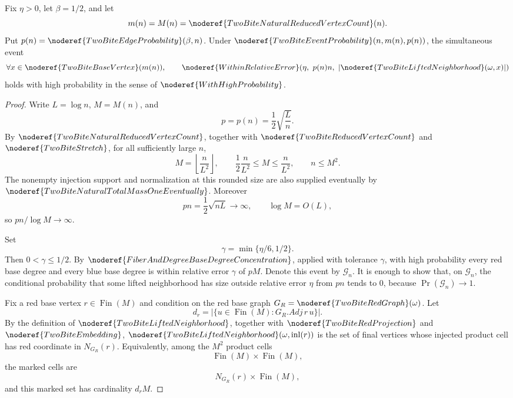 \begin{helper}
Fix \(\eta>0\), let \(\beta=1/2\), and let
\[
m(n)=M(n)=\noderef{TwoBiteNaturalReducedVertexCount}(n).
\]
Put \(p(n)=\noderef{TwoBiteEdgeProbability}(\beta,n)\).  Under
\(\noderef{TwoBiteEventProbability}(n,m(n),p(n))\), the simultaneous event
\[
\forall x\in \noderef{TwoBiteBaseVertex}(m(n)),\qquad
\noderef{WithinRelativeError}\!\left(
  \eta,\ p(n)n,\ |\noderef{TwoBiteLiftedNeighborhood}(\omega,x)|
\right)
\]
holds with high probability in the sense of \(\noderef{WithHighProbability}\).
\end{helper}
\begin{proof}
Write \(L=\log n\), \(M=M(n)\), and
\[
p=p(n)=\frac12\sqrt{\frac{L}{n}}.
\]
By \(\noderef{TwoBiteNaturalReducedVertexCount}\), together with
\(\noderef{TwoBiteReducedVertexCount}\) and \(\noderef{TwoBiteStretch}\), for
all sufficiently large \(n\),
\[
M=\left\lfloor\frac{n}{L^2}\right\rfloor,\qquad
\frac12\frac{n}{L^2}\le M\le \frac n{L^2},\qquad n\le M^2.
\tag{1}
\]
The nonempty injection support and normalization at this rounded size are
also supplied eventually by \(\noderef{TwoBiteNaturalTotalMassOneEventually}\).
Moreover
\[
pn=\frac12\sqrt{nL}\to\infty,\qquad \log M=O(L),
\tag{2}
\]
so \(pn/\log M\to\infty\).

Set
\[
\gamma=\min\{\eta/6,1/2\}.
\]
Then \(0<\gamma\le1/2\).  By
\(\noderef{FiberAndDegreeBaseDegreeConcentration}\), applied with tolerance
\(\gamma\), with high probability every red base degree and every blue base
degree is within relative error \(\gamma\) of \(pM\).  Denote this event by
\(\mathcal G_n\).  It is enough to show that, on \(\mathcal G_n\), the
conditional probability that some lifted neighborhood has size outside
relative error \(\eta\) from \(pn\) tends to \(0\), because
\(\Pr(\mathcal G_n)\to1\).

Fix a red base vertex \(r\in\operatorname{Fin}(M)\) and condition on the red
base graph \(G_R=\noderef{TwoBiteRedGraph}(\omega)\).  Let
\[
d_r=\big|\{u\in\operatorname{Fin}(M):G_R.Adj\,r\,u\}\big|.
\]
By the definition of \(\noderef{TwoBiteLiftedNeighborhood}\), together with
\(\noderef{TwoBiteRedProjection}\) and \(\noderef{TwoBiteEmbedding}\),
\(\noderef{TwoBiteLiftedNeighborhood}(\omega,\operatorname{inl}(r))\) is the
set of final vertices whose injected product cell has red coordinate in
\(N_{G_R}(r)\).  Equivalently, among the \(M^2\) product cells
\[
\operatorname{Fin}(M)\times\operatorname{Fin}(M),
\]
the marked cells are
\[
N_{G_R}(r)\times\operatorname{Fin}(M),
\]
and this marked set has cardinality \(d_rM\).


\end{proof}
